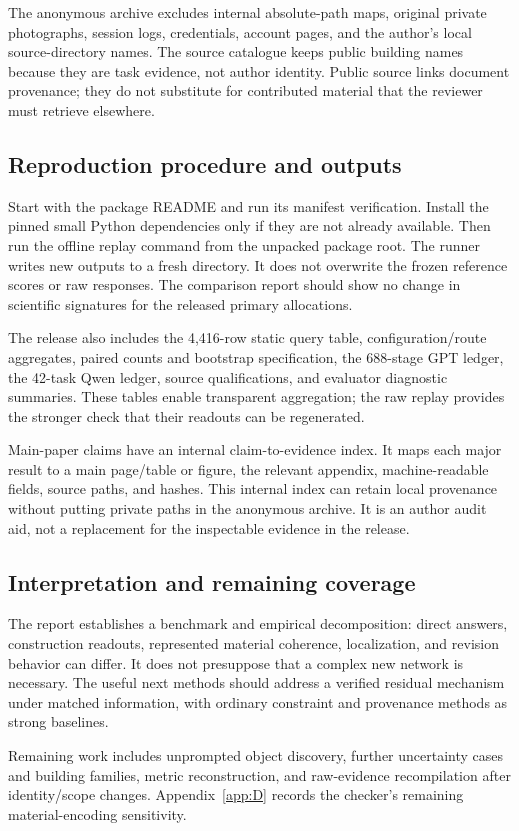 The anonymous archive excludes internal absolute-path maps, original private photographs, session logs, credentials, account pages, and the author's local source-directory names. The source catalogue keeps public building names because they are task evidence, not author identity. Public source links document provenance; they do not substitute for contributed material that the reviewer must retrieve elsewhere.

\subsection{Reproduction procedure and outputs}
Start with the package README and run its manifest verification. Install the pinned small Python dependencies only if they are not already available. Then run the offline replay command from the unpacked package root. The runner writes new outputs to a fresh directory. It does not overwrite the frozen reference scores or raw responses. The comparison report should show no change in scientific signatures for the released primary allocations.

The release also includes the 4,416-row static query table, configuration/route aggregates, paired counts and bootstrap specification, the 688-stage GPT ledger, the 42-task Qwen ledger, source qualifications, and evaluator diagnostic summaries. These tables enable transparent aggregation; the raw replay provides the stronger check that their readouts can be regenerated.

Main-paper claims have an internal claim-to-evidence index. It maps each major result to a main page/table or figure, the relevant appendix, machine-readable fields, source paths, and hashes. This internal index can retain local provenance without putting private paths in the anonymous archive. It is an author audit aid, not a replacement for the inspectable evidence in the release.

\subsection{Interpretation and remaining coverage}
The report establishes a benchmark and empirical decomposition: direct answers, construction readouts, represented material coherence, localization, and revision behavior can differ. It does not presuppose that a complex new network is necessary. The useful next methods should address a verified residual mechanism under matched information, with ordinary constraint and provenance methods as strong baselines.

Remaining work includes unprompted object discovery, further uncertainty cases and building families, metric reconstruction, and raw-evidence recompilation after identity/scope changes. Appendix~\ref{app:D} records the checker's remaining material-encoding sensitivity.
